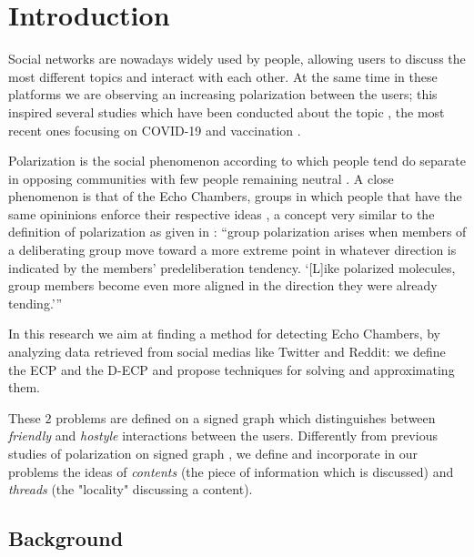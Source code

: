 \chapter{Introduction}
\label{ch:introduction}

Social networks are nowadays widely used by people, allowing users to
discuss the most different topics and interact with each other. At the same time in these
platforms we are observing an increasing polarization between the users;
this inspired several studies which have been conducted about the topic
\cite{Garimella2018}\cite{Guerra2013}\cite{conover2011political}\cite{gruzd2014investigating},
the most recent ones focusing on COVID-19
\cite{Jiang2021}\cite{green2020elusive}\cite{jiang2020political}\cite{lang2021maskon}
and vaccination \cite{Cossard2020}.

Polarization is the social phenomenon according to which people tend do
separate in opposing communities with few people remaining neutral
\cite{Guerra2013}. A close phenomenon is that of the Echo Chambers, groups in
which people that have the same opininions enforce their respective ideas
\cite{Garimella2018}, a concept very similar to the definition of polarization
as given in \cite{sunstein1999law}: ``group polarization arises when members of
a deliberating group move toward a more extreme point in whatever direction is
indicated by the members' predeliberation  tendency. `[L]ike polarized
molecules, group members become even more aligned in the direction they were
already tending.'\cite{turner1987rediscovering}''

In this research we aim at finding a method for detecting Echo Chambers, by
analyzing data retrieved from social medias like Twitter and Reddit: we define
the \acrfull{ECP} and the \acrfull{D-ECP} and propose techniques for solving
and approximating them.

These $2$ problems are defined on a signed graph which distinguishes
between \emph{friendly} and \emph{hostyle} interactions between the users.
Differently from previous studies of polarization on signed graph
\cite{xiao2020searching}, we define
and incorporate in our problems the ideas of \emph{contents} (the piece of
information which is discussed) and \emph{threads} (the "locality"
discussing a content).

\section{Background}
\label{sec:background}

